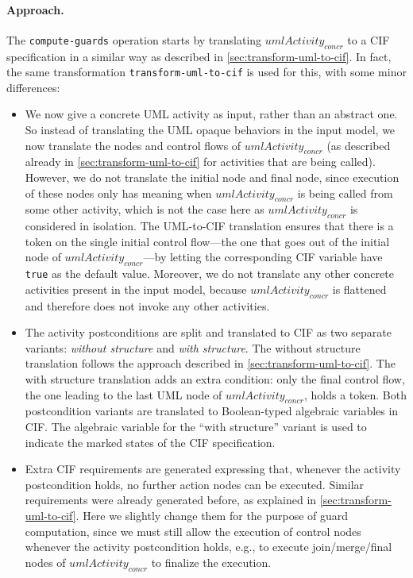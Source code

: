 \documentclass{article}
\newcommand{\keyw}[1]{\texttt{#1}}
\newcommand{\var}[1]{\ensuremath{\mathit{#1}}}
\newcommand{\transformUmlToCifLabel}[0]{\keyw{transform-uml-to-cif}}
\newcommand{\computeGuardsLabel}[0]{\keyw{compute-guards}}
\theoremstyle{definition}
\begin{document}
\paragraph{Approach.}
The \computeGuardsLabel{} operation starts by translating \var{umlActivity_{concr}} to a CIF specification in a similar way as described in \autoref{sec:transform-uml-to-cif}.
In fact, the same transformation \transformUmlToCifLabel{} is used for this, with some minor differences:
\begin{itemize}
	\item We now give a concrete UML activity as input, rather than an abstract one.
	So instead of translating the UML opaque behaviors in the input model, we now translate the nodes and control flows of \var{umlActivity_{concr}} (as described already in \autoref{sec:transform-uml-to-cif} for activities that are being called).
	However, we do not translate the initial node and final node, since execution of these nodes only has meaning when \var{umlActivity_{concr}} is being called from some other activity, which is not the case here as \var{umlActivity_{concr}} is considered in isolation.
	The UML-to-CIF translation ensures that there is a token on the single initial control flow---the one that goes out of the initial node of \var{umlActivity_{concr}}---by letting the corresponding CIF variable have \texttt{true} as the default value.
	Moreover, we do not translate any other concrete activities present in the input model, because \var{umlActivity_{concr}} is flattened and therefore does not invoke any other activities.
	\item The activity postconditions are split and translated to CIF as two separate variants: \emph{without structure} and \emph{with structure}. 
	The without structure translation follows the approach described in \autoref{sec:transform-uml-to-cif}. 
	The with structure translation adds an extra condition: only the final control flow, the one leading to the last UML node of \var{umlActivity_{concr}}, holds a token.
	Both postcondition variants are translated to Boolean-typed algebraic variables in CIF.
	The algebraic variable for the ``with structure'' variant is used to indicate the marked states of the CIF specification.
	\item Extra CIF requirements are generated expressing that, whenever the activity postcondition holds, no further action nodes can be executed.
	Similar requirements were already generated before, as explained in \autoref{sec:transform-uml-to-cif}.
	Here we slightly change them for the purpose of guard computation, since we must still allow the execution of control nodes whenever the activity postcondition holds, e.g., to execute join/merge/final nodes of \var{umlActivity_{concr}} to finalize the execution.

\end{itemize}
\end{document}
